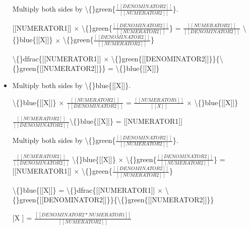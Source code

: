 \documentclass{article}
\begin{document}
\begin{itemize}
                        
                            Multiply both sides by \textbackslash\{\}green\{$\frac{[[DENOMINATOR2]]}{[[NUMERATOR2]]}$\}.
                            
                                [[NUMERATOR1]] $\times$ \textbackslash\{\}green\{$\frac{[[DENOMINATOR2]]}{[[NUMERATOR2]]}$\} = 
                                $\frac{[[NUMERATOR2]]}{[[DENOMINATOR2]]}$ \textbackslash\{\}blue\{[[X]]\} $\times$ 
                                \textbackslash\{\}green\{$\frac{[[DENOMINATOR2]]}{[[NUMERATOR2]]}$\}
                            
                        
                        
                            \textbackslash\{\}dfrac\{[[NUMERATOR1]] $\times$ \textbackslash\{\}green\{[[DENOMINATOR2]]\}\}\{\textbackslash\{\}green\{[[NUMERATOR2]]\}\} =
                            \textbackslash\{\}blue\{[[X]]\}
  \item Multiply both sides by \textbackslash\{\}blue\{[[X]]\}.
                            
                                \textbackslash\{\}blue\{[[X]]\} $\times$ $\frac{[[NUMERATOR2]]}{[[DENOMINATOR2]]}$ =
                                $\frac{[[NUMERATOR1]]}{[[X]]}$ $\times$ \textbackslash\{\}blue\{[[X]]\}
                            
                        
                        
                            $\frac{[[NUMERATOR2]]}{[[DENOMINATOR2]]}$\textbackslash\{\}blue\{[[X]]\} = [[NUMERATOR1]]
                        
                        
                            Multiply both sides by \textbackslash\{\}green\{$\frac{[[DENOMINATOR2]]}{[[NUMERATOR2]]}$\}.
                            
                                $\frac{[[NUMERATOR2]]}{[[DENOMINATOR2]]}$ \textbackslash\{\}blue\{[[X]]\} $\times$ 
                                \textbackslash\{\}green\{$\frac{[[DENOMINATOR2]]}{[[NUMERATOR2]]}$\} =
                                [[NUMERATOR1]] $\times$ \textbackslash\{\}green\{$\frac{[[DENOMINATOR2]]}{[[NUMERATOR2]]}$\}
                            
                        
                        
                            \textbackslash\{\}blue\{[[X]]\} = 
                            \textbackslash\{\}dfrac\{[[NUMERATOR1]] $\times$ \textbackslash\{\}green\{[[DENOMINATOR2]]\}\}\{\textbackslash\{\}green\{[[NUMERATOR2]]\}\}
  \item [[X]] = $\frac{[[DENOMINATOR2 * NUMERATOR1]]}{[[NUMERATOR2]]}$
\end{itemize}
\end{document}
